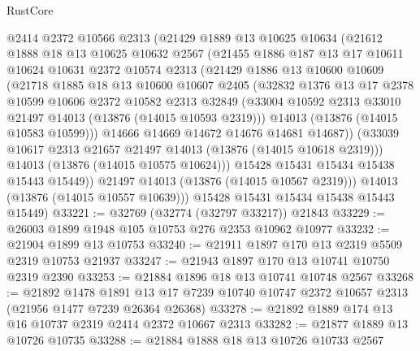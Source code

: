 \begin{lexlean}{RustCore}
\begin{coremodule}
          @2414
          @2372
          @10566
          @2313
          (@21429
            @1889
            @13
            @10625
            @10634
            (@21612
              @1888
              @18
              @13
              @10625
              @10632
              @2567
              (@21455
                @1886
                @187
                @13
                @17
                @10611
                @10624
                @10631
                @2372
                @10574
                @2313
                (@21429
                  @1886
                  @13
                  @10600
                  @10609
                  (@21718
                    @1885
                    @18
                    @13
                    @10600
                    @10607
                    @2405
                    (@32832
                      @1376
                      @13
                      @17
                      @2378
                      @10599
                      @10606
                      @2372
                      @10582
                      @2313
                      @32849
                      (@33004 @10592 @2313 @33010 @21497 @14013 (@13876 (@14015 @10593 @2319)))
                      @14013
                      (@13876 (@14015 @10583 @10599)))
                    @14666
                    @14669
                    @14672
                    @14676
                    @14681
                    @14687))
                (@33039 @10617 @2313 @21657 @21497 @14013 (@13876 (@14015 @10618 @2319)))
                @14013
                (@13876 (@14015 @10575 @10624)))
              @15428
              @15431
              @15434
              @15438
              @15443
              @15449))
          @21497
          @14013
          (@13876 (@14015 @10567 @2319)))
        @14013
        (@13876 (@14015 @10557 @10639)))
      @15428
      @15431
      @15434
      @15438
      @15443
      @15449)
@33221 := @32769 (@32774 (@32797 @33217)) @21843
@33229 := @26003 @1899 @1948 @105 @10753 @276 @2353 @10962 @10977
@33232 := @21904 @1899 @13 @10753
@33240 := @21911 @1897 @170 @13 @2319 @5509 @2319 @10753 @21937
@33247 := @21943 @1897 @170 @13 @10741 @10750 @2319 @2390
@33253 := @21884 @1896 @18 @13 @10741 @10748 @2567
@33268 := @21892
    @1478
    @1891
    @13
    @17
    @7239
    @10740
    @10747
    @2372
    @10657
    @2313
    (@21956 @1477 @7239 @26364 @26368)
@33278 := @21892 @1889 @174 @13 @16 @10737 @2319 @2414 @2372 @10667 @2313
@33282 := @21877 @1889 @13 @10726 @10735
@33288 := @21884 @1888 @18 @13 @10726 @10733 @2567

\end{coremodule}
\end{lexlean}
